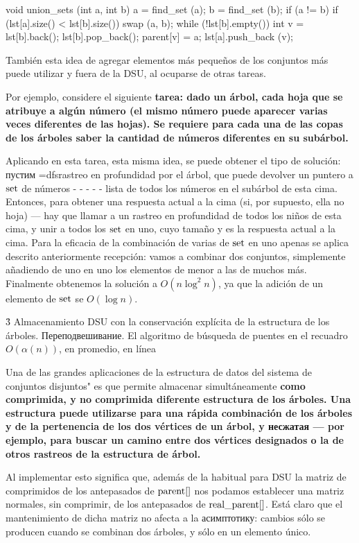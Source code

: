 void union_sets (int a, int b) {
a = find_set (a);
b = find_set (b);
if (a != b) {
if (lst[a].size() < lst[b].size())
swap (a, b);
while (!lst[b].empty()) {
int v = lst[b].back();
lst[b].pop_back();
parent[v] = a;
lst[a].push_back (v);
}
}
}
\endcode

También esta idea de agregar elementos más pequeños de los conjuntos más puede utilizar y fuera de la DSU, al ocuparse de otras tareas.

Por ejemplo, considere el siguiente \bf{tarea}: dado un árbol, cada hoja que se atribuye a algún número (el mismo número puede aparecer varias veces diferentes de las hojas). Se requiere para cada una de las copas de los árboles saber la cantidad de números diferentes en su subárbol.

Aplicando en esta tarea, esta misma idea, se puede obtener el tipo de solución: пустим \algohref=dfs{rastreo en profundidad} por el árbol, que puede devolver un puntero a ${\rm set}$ de números - - - - - lista de todos los números en el subárbol de esta cima. Entonces, para obtener una respuesta actual a la cima (si, por supuesto, ella no hoja) --- hay que llamar a un rastreo en profundidad de todos los niños de esta cima, y unir a todos los ${\rm set}$ en uno, cuyo tamaño y es la respuesta actual a la cima. Para la eficacia de la combinación de varias de ${\rm set}$ en uno apenas se aplica descrito anteriormente recepción: vamos a combinar dos conjuntos, simplemente añadiendo de uno en uno los elementos de menor a las de muchos más. Finalmente obtenemos la solución a $O (n \log^2 n)$, ya que la adición de un elemento de ${\rm set}$ se $O (\log n)$.



\h3{ Almacenamiento DSU con la conservación explícita de la estructura de los árboles. Переподвешивание. El algoritmo de búsqueda de puentes en el recuadro $O(\alpha(n))$, en promedio, en línea }

Una de las grandes aplicaciones de la estructura de datos del sistema de conjuntos disjuntos" es que permite almacenar simultáneamente \bf{como comprimida, y no comprimida diferente estructura de los árboles}. Una estructura puede utilizarse para una rápida combinación de los árboles y de la pertenencia de los dos vértices de un árbol, y несжатая --- por ejemplo, para buscar un camino entre dos vértices designados o la de otros rastreos de la estructura de árbol.

Al implementar esto significa que, además de la habitual para DSU la matriz de comprimidos de los antepasados de ${\rm parent}[]$ nos podamos establecer una matriz normales, sin comprimir, de los antepasados de ${\rm real\_parent}[]$. Está claro que el mantenimiento de dicha matriz no afecta a la асимптотику: cambios sólo se producen cuando se combinan dos árboles, y sólo en un elemento único.

